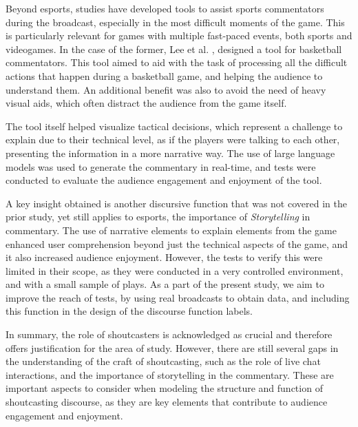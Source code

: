 \medskip

Beyond esports, studies have developed tools to assist sports commentators during the broadcast, especially in the most difficult moments of the game. This is particularly relevant for games with multiple fast-paced events, both sports and videogames. In the case of the former, Lee et al. \cite{lee2025sportify}, designed a tool for basketball commentators. This tool aimed to aid with the task of processing all the difficult actions that happen during a basketball game, and helping the audience to understand them. An additional benefit was also to avoid the need of heavy visual aids, which often distract the audience from the game itself.

\medskip
The tool itself helped visualize tactical decisions, which represent a challenge to explain due to their technical level, as if the players were talking to each other, presenting the information in a more narrative way. The use of large language models was used to generate the commentary in real-time, and tests were conducted to evaluate the audience engagement and enjoyment of the tool. 

\medskip

A key insight obtained is another discursive function that was not covered in the prior study, yet still applies to esports, the importance of \textit{Storytelling} in commentary. The use of narrative elements to explain elements from the game enhanced user comprehension beyond just the technical aspects of the game, and it also increased audience enjoyment. However, the tests to verify this were limited in their scope, as they were conducted in a very controlled environment, and with a small sample of plays. As a part of the present study, we aim to improve the reach of tests, by using real broadcasts to obtain data, and including this function in the design of the discourse function labels. 

\medskip

In summary, the role of shoutcasters is acknowledged as crucial and therefore offers justification for the area of study. However, there are still several gaps in the understanding of the craft of shoutcasting, such as the role of live chat interactions, and the importance of storytelling in the commentary. These are important aspects to consider when modeling the structure and function of shoutcasting discourse, as they are key elements that contribute to audience engagement and enjoyment.

